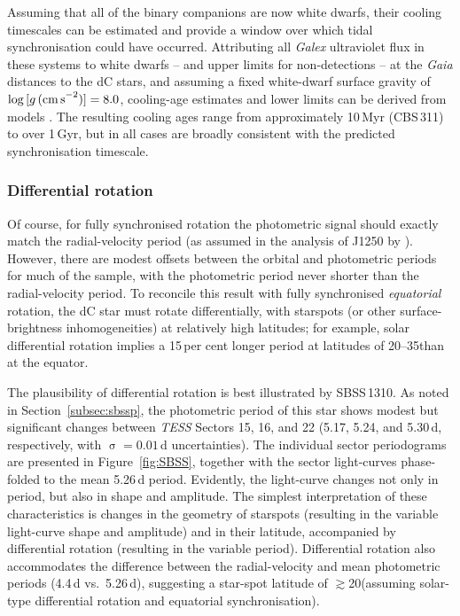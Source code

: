 \documentclass[fleqn,usenatbib,useAMS]{mnras}
\begin{document}
Assuming that all of the binary companions are now white dwarfs, their cooling timescales can be estimated and provide a window over which tidal synchronisation could have occurred.  Attributing all {\em Galex} ultraviolet flux in these systems to white dwarfs -- and upper limits for non-detections -- at the {\em Gaia} distances to the dC stars, and assuming a fixed white-dwarf surface gravity of $\log\,[g\,{\rm (cm\,s}^{-2})] = 8.0$, cooling-age estimates and lower limits can be derived from models \citep{B_dard_2020}.  The resulting cooling ages range from approximately 10\,Myr (CBS\,311) to over 1\,Gyr, but in all cases are broadly consistent with the predicted synchronisation timescale.  


\subsubsection{Differential rotation}
\label{subsec:drot}

Of course, for fully synchronised rotation the photometric signal should exactly match the radial-velocity period (as assumed in the analysis of J1250 by \citealt{Margon18}).  However, there are modest offsets between the orbital and photometric periods for much of the sample, with the photometric period never shorter than the radial-velocity period.  To reconcile this result with fully synchronised \textit{equatorial} rotation, the dC star must rotate differentially, with starspots 
(or other surface-brightness inhomogeneities) at relatively high latitudes; for example, solar differential rotation implies a 15\,per cent longer period at latitudes of 20--35\degr than at the equator.

The plausibility of differential rotation is best illustrated by SBSS\,1310. As noted in Section~\ref{subsec:sbssp}, the photometric period of this star shows modest but significant changes between \textit{TESS} Sectors 15, 16, and 22 (5.17, 5.24, and 5.30\,d, respectively, with $\upsigma=0.01$\,d uncertainties).  The individual sector periodograms are presented in Figure~\ref{fig:SBSS}, together with the sector light-curves phase-folded to the mean 5.26\,d period.  Evidently, the light-curve changes not only in period, but also in shape and amplitude.  The simplest interpretation of these characteristics is changes in the geometry of starspots (resulting in the variable light-curve shape and amplitude) and in their latitude, accompanied by differential rotation (resulting in the variable period).   Differential rotation also accommodates the difference between the radial-velocity and mean photometric periods (4.4\,d vs.\, 5.26\,d), suggesting a star-spot latitude of $\gtrsim$20\degr (assuming solar-type differential rotation and equatorial synchronisation).  
\end{document}
